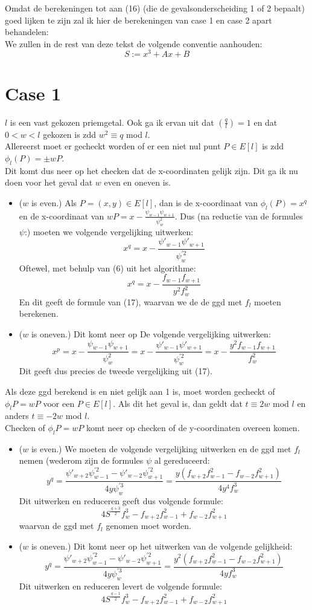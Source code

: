 \documentclass[10pt]{article}
\begin{document}
Omdat de berekeningen tot aan (16) (die de gevalsonderscheiding 1 of 2 bepaalt) goed lijken te zijn zal ik hier de berekeningen van case 1 en case 2 apart behandelen:\\
We zullen in de rest van deze tekst de volgende conventie aanhouden:
$$S:=x^3+Ax+B$$

\section{Case 1}
$l$ is een vast gekozen priemgetal. Ook ga ik ervan uit dat $(\frac{q}{l})=1$ en dat $0<w<l$ gekozen is zdd $w^2 \equiv q$ mod $l$.\\
Allereerst moet er gecheckt worden of er een niet nul punt $P \in E[l]$ is zdd $\phi_l(P)=\pm wP$.\\
Dit komt dus neer op het checken dat de x-coordinaten gelijk zijn. Dit ga ik nu doen voor het geval dat $w$ even en oneven is.

\begin{itemize}
\item ($w$ is even.) Als $P=(x,y) \in E[l]$, dan is de x-coordinaat van $\phi_l(P)=x^q$ en de x-coordinaat van $wP=x-\frac{\psi_{w-1}\psi_{w+1}}{\psi _w^2}$. Dus (na reductie van de formules $\psi$:) moeten we volgende vergelijking uitwerken:
$$x^q=x-\frac{\psi'_{w-1}\psi'_{w+1}}{\psi _w^{'2}}$$
Oftewel, met behulp van (6) uit het algorithme:
$$x^q=x-\frac{f_{w-1}f_{w+1}}{y^2f_w^{2}}$$
En dit geeft de formule van (17), waarvan we de de ggd met $f_l$ moeten berekenen.
\item ($w$ is oneven.) Dit komt neer op De volgende vergelijking uitwerken:
$$  x^p=x-\frac{\psi_{w-1}\psi_{w+1}}{\psi _w^2}=x-\frac{\psi'_{w-1}\psi'_{w+1}}{\psi _w^{'2}}=x-\frac{y^2f_{w-1}f_{w+1}}{f_w^{2}} $$
Dit geeft dus precies de tweede vergelijking uit (17).
\end{itemize}

Als deze ggd berekend is en niet gelijk aan 1 is, moet worden gecheckt of $\phi _lP=wP$ voor een $P \in E[l]$. Als dit het geval is, dan geldt dat $t \equiv 2w$ mod $l$ en anders $t \equiv -2w$ mod $l$.\\
Checken of $\phi _lP = wP$ komt neer op checken of de y-coordinaten overeen komen.

\begin{itemize}
\item ($w$ is even.) We moeten de volgende vergelijking uitwerken en de ggd met $f_l$ nemen (wederom zijn de formules $\psi$ al gereduceerd:
$$  y^q=\frac{\psi'_{w+2}\psi_{w-1}^{'2}-\psi'_{w-2}\psi_{w+1}^{'2}}{4y\psi_w^{'3}}=\frac{y(f_{w+2}f_{w-1}^2-f_{w-2}f_{w+1}^2)}{4y^4f_w^3} $$
Dit uitwerken en reduceren geeft dus volgende formule:
$$4S^{\frac{q+3}{2}}f_w^3-f_{w+2}f_{w-1}^2+f_{w-2}f_{w+1}^2$$
waarvan de ggd met $f_l$ genomen moet worden.
\item ($w$ is oneven.) Dit komt neer op het uitwerken van de volgende gelijkheid:
$$  y^q=\frac{\psi'_{w+2}\psi_{w-1}^{'2}-\psi'_{w-2}\psi_{w+1}^{'2}}{4y\psi_w^{'3}}=\frac{y^2(f_{w+2}f_{w-1}^2-f_{w-2}f_{w+1}^2)}{4yf_w^3}$$
Dit uitwerken en reduceren levert de volgende formule:
$$4S^{\frac{q-1}{2}}f_w^3-f_{w+2}f_{w-1}^2+f_{w-2}f_{w+1}^2$$
\end{itemize}
\end{document}
